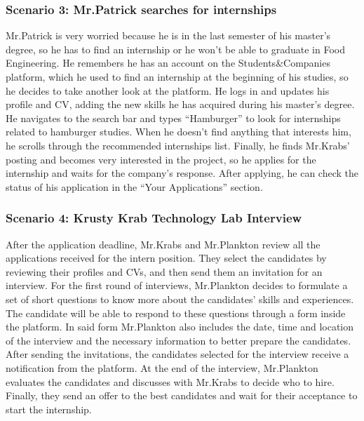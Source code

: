 \subsubsection{Scenario 3: Mr.Patrick searches for internships}\label{subsubsec:scenario_3}
Mr.Patrick is very worried because he is in the last semester of his master's degree, so he has to find an internship or he won't be able to graduate in Food Engineering.
He remembers he has an account on the Students\&Companies platform, which he used to find an internship at the beginning of his studies, so he decides 
to take another look at the platform. He logs in and updates his profile and CV, adding the new skills he has acquired during his master’s degree.
He navigates to the search bar and types ``Hamburger'' to look for internships related to hamburger studies. When he doesn’t find anything that 
interests him, he scrolls through the recommended internships list. Finally, he finds Mr.Krabs' posting and becomes very interested in the 
project, so he applies for the internship and waits for the company's response. After applying, he can check the status of his application in 
the ``Your Applications'' section.

\subsubsection{Scenario 4: Krusty Krab Technology Lab Interview}\label{subsubsec:scenario_4}
After the application deadline, Mr.Krabs and Mr.Plankton review all the applications received for the intern position. They select the
candidates by reviewing their profiles and CVs, and then send them an invitation for an interview. For the first round of interviews, Mr.Plankton
decides to formulate a set of short questions to know more about the candidates' skills and experiences. The candidate will be able to respond to 
these questions through a form inside the platform. In said form Mr.Plankton also includes the date, time and location of the interview and the 
necessary information to better prepare the candidates. After sending the invitations, the candidates selected for the interview receive a notification 
from the platform. At the end of the interview, Mr.Plankton evaluates the candidates and discusses with Mr.Krabs to decide who to hire. Finally, they 
send an offer to the best candidates and wait for their acceptance to start the internship.

